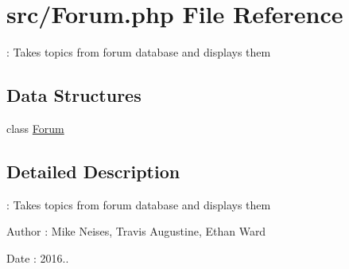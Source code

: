 \hypertarget{_forum_8php}{}\section{src/\+Forum.php File Reference}
\label{_forum_8php}


\+: Takes topics from forum database and displays them  


\subsection*{Data Structures}
\begin{DoxyCompactItemize}
\item 
class \hyperlink{class_forum}{Forum}
\end{DoxyCompactItemize}


\subsection{Detailed Description}
\+: Takes topics from forum database and displays them 

\begin{DoxyAuthor}{Author}
\+: Mike Neises, Travis Augustine, Ethan Ward 
\end{DoxyAuthor}
\begin{DoxyDate}{Date}
\+: 2016.. 
\end{DoxyDate}
